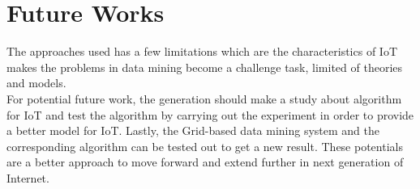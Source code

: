 \documentclass[a4paper,12pt]{article}
\begin{document}
{\section{Future Works}
The approaches used has a few limitations which are the characteristics of IoT makes the problems in data mining become a challenge task, limited of theories and models.\\
\indent
For potential future work, the generation should make a study about algorithm for IoT and test the algorithm by carrying out the experiment in order to provide a better model for IoT. Lastly, the Grid-based data mining system  and the corresponding algorithm can be tested out to get a new result. These potentials are a better approach to move forward and extend further in next generation of Internet.
{}
}
\end{document}
